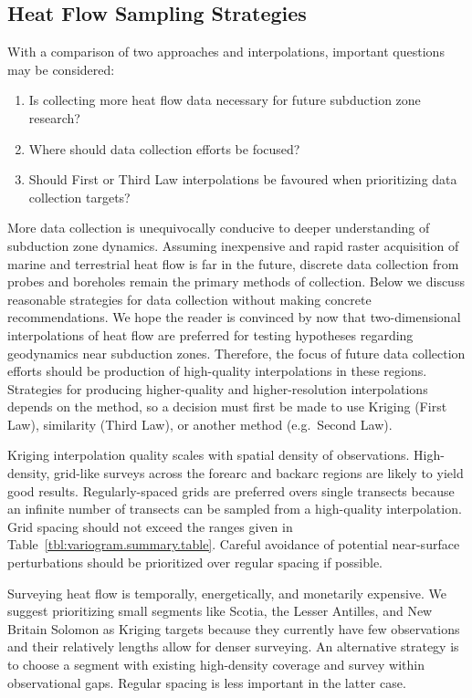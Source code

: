 \documentclass[draft,linenumbers]{agujournal2018}
\begin{document}
\subsection{Heat Flow Sampling Strategies}

With a comparison of two approaches and interpolations, important
questions may be considered:

\begin{enumerate}
\def\labelenumi{\arabic{enumi}.}
\item
  Is collecting more heat flow data necessary for future subduction zone
  research?
\item
  Where should data collection efforts be focused?
\item
  Should First or Third Law interpolations be favoured when prioritizing
  data collection targets?
\end{enumerate}

More data collection is unequivocally conducive to deeper understanding
of subduction zone dynamics. Assuming inexpensive and rapid raster
acquisition of marine and terrestrial heat flow is far in the future,
discrete data collection from probes and boreholes remain the primary
methods of collection. Below we discuss reasonable strategies for data
collection without making concrete recommendations. We hope the reader
is convinced by now that two-dimensional interpolations of heat flow are
preferred for testing hypotheses regarding geodynamics near subduction
zones. Therefore, the focus of future data collection efforts should be
production of high-quality interpolations in these regions. Strategies
for producing higher-quality and higher-resolution interpolations
depends on the method, so a decision must first be made to use Kriging
(First Law), similarity (Third Law), or another method (e.g.~Second
Law).

Kriging interpolation quality scales with spatial density of
observations. High-density, grid-like surveys across the forearc and
backarc regions are likely to yield good results. Regularly-spaced grids
are preferred overs single transects because an infinite number of
transects can be sampled from a high-quality interpolation. Grid spacing
should not exceed the ranges given in
Table~\ref{tbl:variogram.summary.table}. Careful avoidance of potential
near-surface perturbations should be prioritized over regular spacing if
possible.

Surveying heat flow is temporally, energetically, and monetarily
expensive. We suggest prioritizing small segments like Scotia, the
Lesser Antilles, and New Britain Solomon as Kriging targets because they
currently have few observations and their relatively lengths allow for
denser surveying. An alternative strategy is to choose a segment with
existing high-density coverage and survey within observational gaps.
Regular spacing is less important in the latter case.
\end{document}
